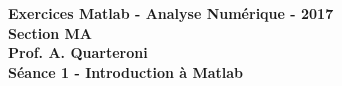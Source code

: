 \begin{center}
  \textbf{Exercices Matlab - Analyse Numérique - 2017 \\
  Section MA \\
  Prof. A. Quarteroni \\
  Séance 1 - Introduction à Matlab}
\end{center}


\vspace{10mm}

\begin{ex}

\end{ex}

\begin{ex}

\end{ex}

\begin{ex}

\end{ex}

\begin{ex}

\end{ex}

\begin{ex}

\end{ex}
